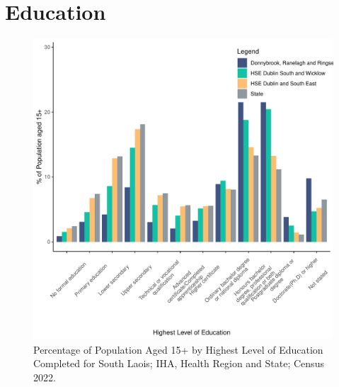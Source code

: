 \documentclass{article}
\begin{document}
\section{Education}\label{sect:Edu}
\begin{figure}[H]
	\centering
	\includegraphics[width = 120mm]{../figures/EduED.pdf}
	\caption{Percentage of Population Aged 15+ by Highest Level of Education Completed for South Laois; IHA, Health Region and State; Census 2022.}
	\label{fig:vbnv}
	\end{figure}
\end{document}
